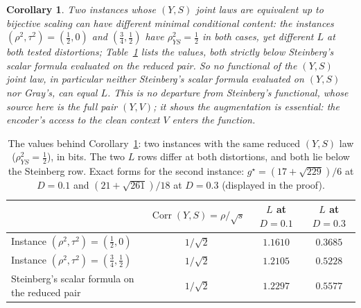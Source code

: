 \documentclass[11pt,onecolumn]{IEEEtran}
\newtheorem{corollary}[theorem]{Corollary}
\begin{document}
\begin{corollary}
\label{cor:notmarginal}
Two instances whose $(Y,S)$ joint laws are equivalent up to bijective
scaling can have different minimal conditional content: the instances
$(\rho^2,\tau^2)=(\tfrac12,0)$ and $(\tfrac34,\tfrac12)$ have
$\rho_{YS}^2=\tfrac12$ in both cases, yet different $L$ at both tested
distortions; Table~\ref{tab:notmarginal} lists the values, both
strictly below Steinberg's scalar formula evaluated on the reduced pair.
So no functional of the $(Y,S)$
joint law, in particular neither Steinberg's scalar formula evaluated on
$(Y,S)$ nor Gray's, can equal $L$. This is no departure from Steinberg's
functional, whose source here is the full pair $(Y,V)$; it shows the
augmentation is essential: the encoder's access to the clean context
$V$ enters the function.
\end{corollary}

\begin{table}[!t]
\caption{The values behind Corollary~\ref{cor:notmarginal}: two
instances with the same reduced $(Y,S)$ law ($\rho_{YS}^2=\tfrac12$),
in bits. The two $L$ rows differ at both distortions, and both lie
below the Steinberg row. Exact forms for the second instance:
$g^\star=(17+\sqrt{229})/6$ at $D=0.1$ and $(21+\sqrt{261})/18$ at
$D=0.3$ (displayed in the proof).}
\label{tab:notmarginal}
\centering
\footnotesize
\begin{tabular}{lccc}
\hline
 & $\operatorname{Corr}(Y,S)=\rho/\sqrt{s}$ & $L$ at $D=0.1$ & $L$ at $D=0.3$\\
\hline
Instance $(\rho^2,\tau^2)=(\tfrac12,0)$ & $1/\sqrt2$ & $1.1610$ & $0.3685$\\
Instance $(\rho^2,\tau^2)=(\tfrac34,\tfrac12)$ & $1/\sqrt2$ & $1.2105$ & $0.5228$\\
Steinberg's scalar formula on the reduced pair & $1/\sqrt2$ & $1.2297$ & $0.5577$\\
\hline
\end{tabular}
\end{table}
\end{document}

